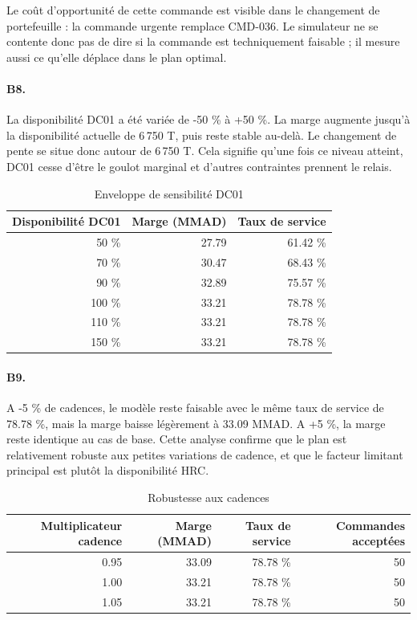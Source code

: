 \documentclass[12pt,a4paper]{article}
\newcommand{\question}[1]{\paragraph{\textcolor{blue!50!black}{#1.}}}
\begin{document}
Le coût d'opportunité de cette commande est visible dans le changement de portefeuille : la commande urgente remplace CMD-036. Le simulateur ne se contente donc pas de dire si la commande est techniquement faisable ; il mesure aussi ce qu'elle déplace dans le plan optimal.

\question{B8}
La disponibilité DC01 a été variée de -50 \% à +50 \%. La marge augmente jusqu'à la disponibilité actuelle de 6\,750 T, puis reste stable au-delà. Le changement de pente se situe donc autour de 6\,750 T. Cela signifie qu'une fois ce niveau atteint, DC01 cesse d'être le goulot marginal et d'autres contraintes prennent le relais.

\begin{table}[H]
\centering
\caption{Enveloppe de sensibilité DC01}
\begin{tabular}{rrr}
\toprule
Disponibilité DC01 & Marge (MMAD) & Taux de service \\
\midrule
50 \% & 27.79 & 61.42 \% \\
70 \% & 30.47 & 68.43 \% \\
90 \% & 32.89 & 75.57 \% \\
100 \% & 33.21 & 78.78 \% \\
110 \% & 33.21 & 78.78 \% \\
150 \% & 33.21 & 78.78 \% \\
\bottomrule
\end{tabular}
\end{table}

\question{B9}
A -5 \% de cadences, le modèle reste faisable avec le même taux de service de 78.78 \%, mais la marge baisse légèrement à 33.09 MMAD. A +5 \%, la marge reste identique au cas de base. Cette analyse confirme que le plan est relativement robuste aux petites variations de cadence, et que le facteur limitant principal est plutôt la disponibilité HRC.

\begin{table}[H]
\centering
\caption{Robustesse aux cadences}
\begin{tabular}{rrrr}
\toprule
Multiplicateur cadence & Marge (MMAD) & Taux de service & Commandes acceptées \\
\midrule
0.95 & 33.09 & 78.78 \% & 50 \\
1.00 & 33.21 & 78.78 \% & 50 \\
1.05 & 33.21 & 78.78 \% & 50 \\
\bottomrule
\end{tabular}
\end{table}
\end{document}

